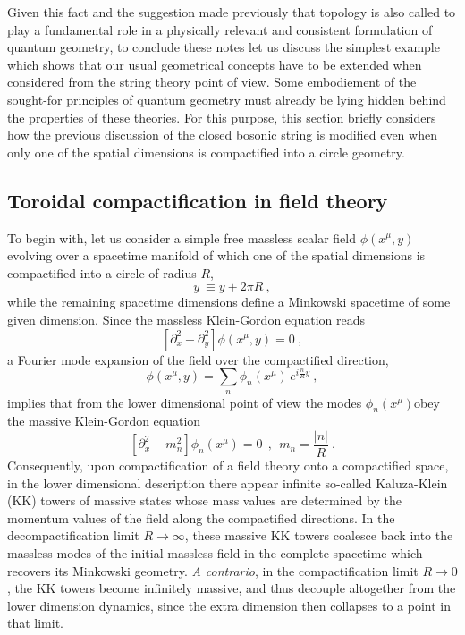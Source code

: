 \documentclass[a4paper,11pt]{article}
\begin{document}
Given this fact and the suggestion made previously that topology is also
called to play a fundamental role in a physically relevant and consistent
formulation of quantum geometry, to conclude these notes let us discuss
the simplest example which shows that our usual geometrical concepts have
to be extended when considered from the string theory point of view.
Some em\-bo\-die\-ment of the sought-for principles of quantum geometry must
already be lying hidden behind the properties of these theories.
For this purpose, this section briefly considers how the previous
discussion of the closed bosonic string is modified even when only one
of the spatial dimensions is compactified into a circle geometry.

\subsection{Toroidal compactification in field theory}
\label{Subsect8.1}

To begin with, let us consider a simple free massless scalar field 
$\phi(x^\mu,y)$ evolving over a spacetime manifold of which one of the 
spatial dimensions is compactified into a circle of radius $R$,
\begin{equation}
y\ \equiv y+2\pi R\ ,
\end{equation}
while the remaining spacetime dimensions define a Minkowski spacetime of
some given dimension. Since the massless Klein-Gordon equation reads
\begin{equation}
\left[\partial^2_x+\partial^2_y\right]\phi(x^\mu,y)=0\ ,
\end{equation}
a Fourier mode expansion of the field over the compactified direction,
\begin{equation}
\phi(x^\mu,y)=\sum_n\phi_n(x^\mu)\,e^{i\frac{n}{R}y}\ ,
\end{equation}
implies that from the lower dimensional point of view the modes 
$\phi_n(x^\mu)$obey the massive Klein-Gordon equation
\begin{equation}
\left[\partial^2_x-m^2_n\right]\phi_n(x^\mu)=0\ \ ,\ \ 
m_n=\frac{|n|}{R}\ .
\end{equation}
Consequently, upon compactification of a field theory onto a compactified
space, in the lower dimensional description there appear infinite
so-called Kaluza-Klein (KK) towers of massive states whose mass values are
determined by the momentum values of the field along the compactified
directions. In the decompactification limit $R\rightarrow\infty$, these
massive KK towers coalesce back into the massless modes of the initial
massless field in the complete spacetime which recovers its Minkowski
geometry. {\sl A contrario\/}, in the compactification limit $R\rightarrow 0$,
the KK towers become infinitely massive, and thus decouple altogether
from the lower dimension dynamics, since the extra dimension then collapses
to a point in that limit.
\end{document}

